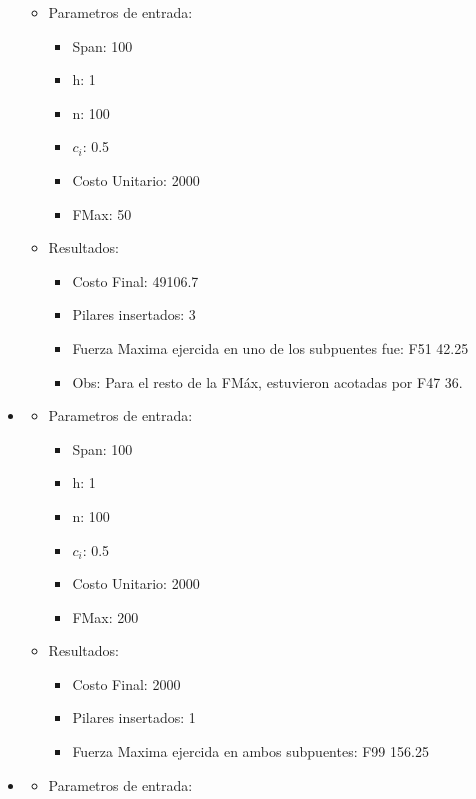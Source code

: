 \begin{itemize}
  \begin{itemize}
    \item Parametros de entrada:
	  \begin{itemize}
	    \item Span: 100
	    \item h: 1
	    \item n: 100
	    \item $c_i$: 0.5
	    \item Costo Unitario: 2000
	    \item FMax: 50
	  \end{itemize}
      \item Resultados:
	  \begin{itemize}
	    \item Costo Final: 49106.7
	    \item Pilares insertados: 3
	    \item Fuerza Maxima ejercida en uno de los subpuentes fue: F51 42.25
	    \item Obs: Para el resto de la FM\'ax, estuvieron acotadas por F47 36.
	  \end{itemize}
      \end{itemize}
\item
  \begin{itemize}
    \item Parametros de entrada:
	  \begin{itemize}
	    \item Span: 100
	    \item h: 1
	    \item n: 100
	    \item $c_i$: 0.5
	    \item Costo Unitario: 2000
	    \item FMax: 200
	  \end{itemize}
      \item Resultados:
	  \begin{itemize}
	    \item Costo Final: 2000
	    \item Pilares insertados: 1
	    \item Fuerza Maxima ejercida en ambos subpuentes: F99 156.25
	  \end{itemize}
      \end{itemize}
\item
  \begin{itemize}
    \item Parametros de entrada:
	  \begin{itemize}

\end{itemize}
\end{itemize}
\end{itemize}
